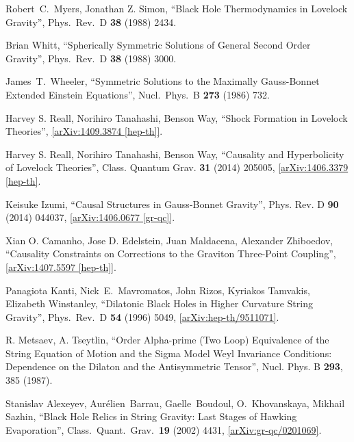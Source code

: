 \documentclass[12pt]{article}
\newcommand{\2}{$^2$}
\newcommand{\3}{$^3$}
\newcommand{\4}{$_4$}
\newcommand{\5}{$_5$}
\begin{document}
\begin{thebibliography}{400}
  Robert~C.~Myers, Jonathan Z. Simon,
  ``Black Hole Thermodynamics in Lovelock Gravity'',
  Phys.\ Rev.\ D {\bf 38} (1988) 2434.

Brian Whitt,
  ``Spherically Symmetric Solutions of General Second Order Gravity'',
  Phys.\ Rev.\ D {\bf 38} (1988) 3000.

  James~T.~Wheeler,
  ``Symmetric Solutions to the Maximally Gauss-Bonnet Extended Einstein Equations'', 
  Nucl.\ Phys.\ B {\bf 273} (1986) 732.
		
Harvey S. Reall, Norihiro Tanahashi, Benson Way, ``Shock Formation in Lovelock Theories'', \href{http://arxiv.org/abs/1409.3874}{[arXiv:1409.3874 [hep-th]]}.

	Harvey S. Reall, Norihiro Tanahashi, Benson Way, ``Causality and Hyperbolicity of Lovelock Theories'',  Class. Quantum Grav. \textbf{31} (2014) 205005, \href{http://arxiv.org/abs/1406.3379}{[arXiv:1406.3379 [hep-th]}.

Keisuke Izumi, ``Causal Structures in Gauss-Bonnet Gravity'', 	Phys. Rev. D \textbf{90} (2014) 044037, \href{http://arxiv.org/abs/1406.0677}{[arXiv:1406.0677 [gr-qc]]}.

Xian O. Camanho, Jose D. Edelstein, Juan Maldacena, Alexander Zhiboedov, ``Causality Constraints on Corrections to the Graviton Three-Point Coupling'', \href{http://arxiv.org/abs/1407.5597}{[arXiv:1407.5597 [hep-th]]}.

Panagiota Kanti, Nick~E.~Mavromatos, John Rizos, Kyriakos Tamvakis, Elizabeth Winstanley,
  ``Dilatonic Black Holes in Higher Curvature String Gravity'', 
  Phys.\ Rev.\ D {\bf 54} (1996) 5049,
  \href{http://arxiv.org/abs/hep-th/9511071}{[arXiv:hep-th/9511071]}.

 R. Metsaev, A. Tseytlin, 
``Order Alpha-prime (Two Loop) Equivalence of the String Equation of Motion and the Sigma Model Weyl Invariance Conditions: Dependence on the Dilaton and the Antisymmetric Tensor'',
Nucl. Phys. B {\bf 293}, 385 (1987).

  Stanislav Alexeyev, Aur\'elien~Barrau, Gaelle~Boudoul, O.~Khovanskaya, Mikhail Sazhin,
  ``Black Hole Relics in String Gravity: Last Stages of Hawking Evaporation'',
  Class.\ Quant.\ Grav.\  {\bf 19} (2002) 4431, 
 \href{http://arxiv.org/abs/gr-qc/0201069}{[arXiv:gr-qc/0201069]}.


\end{thebibliography}
\end{document}
